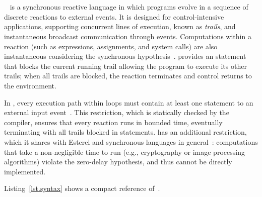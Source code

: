 \section{\CEU}
\label{sec.ceu}

\CEU~\cite{ceu.sensys13,ceu.tecs17} is a synchronous reactive language in which
programs evolve in a sequence of discrete reactions to external events.
%
It is designed for control-intensive applications, supporting concurrent lines
of execution, known as \emph{trails}, and instantaneous broadcast communication
through events.
%
Computations within a reaction (such as expressions, assignments, and
system calls) are also instantaneous considering the synchronous
hypothesis~\cite{rp.hypothesis}.
%
%
\CEU provides an  statement that blocks the current running trail
allowing the program to execute its other trails; when all trails are blocked,
the reaction terminates and control returns to the environment.

In \CEU, every execution path within loops must contain at least one
 statement to an external input
event~\cite{ceu.sensys13,esterel.primer}.
%
This restriction, which is statically checked by the compiler, ensures that
every reaction runs in bounded time, eventually terminating with all trails
blocked in  statements.
%
\CEU has an additional restriction, which it shares with Esterel and
synchronous languages in general~\cite{esterel.preemption}: computations that
take a non-negligible time to run (e.g., cryptography or image processing
algorithms) violate the zero-delay hypothesis, and thus cannot be directly
implemented.

Listing~\ref{lst.syntax} shows a compact reference of~\CEU.

